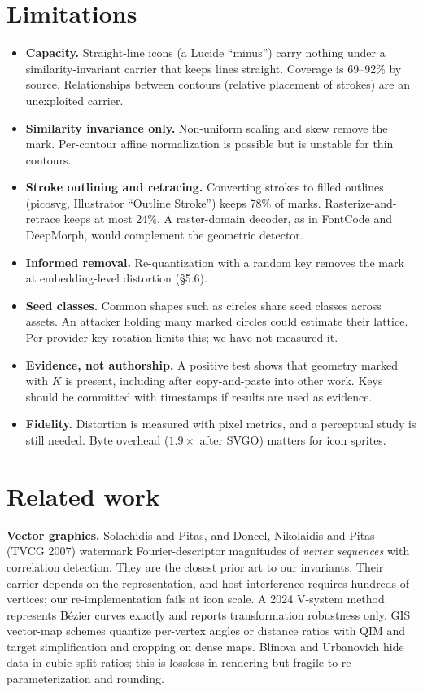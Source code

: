\documentclass[10pt,twocolumn]{article}
\begin{document}
\section{Limitations}
\begin{itemize}
\item \textbf{Capacity.} Straight-line icons (a Lucide ``minus'') carry nothing under a similarity-invariant carrier that keeps lines straight. Coverage is 69--92\% by source. Relationships between contours (relative placement of strokes) are an unexploited carrier.
\item \textbf{Similarity invariance only.} Non-uniform scaling and skew remove the mark. Per-contour affine normalization is possible but is unstable for thin contours.
\item \textbf{Stroke outlining and retracing.} Converting strokes to filled outlines (picosvg, Illustrator ``Outline Stroke'') keeps 78\% of marks. Rasterize-and-retrace keeps at most 24\%. A raster-domain decoder, as in FontCode and DeepMorph, would complement the geometric detector.
\item \textbf{Informed removal.} Re-quantization with a random key removes the mark at embedding-level distortion (\S5.6).
\item \textbf{Seed classes.} Common shapes such as circles share seed classes across assets. An attacker holding many marked circles could estimate their lattice. Per-provider key rotation limits this; we have not measured it.
\item \textbf{Evidence, not authorship.} A positive test shows that geometry marked with $K$ is present, including after copy-and-paste into other work. Keys should be committed with timestamps if results are used as evidence.
\item \textbf{Fidelity.} Distortion is measured with pixel metrics, and a perceptual study is still needed. Byte overhead ($1.9\times$ after SVGO) matters for icon sprites.
\end{itemize}

\section{Related work}
\textbf{Vector graphics.} Solachidis and Pitas, and Doncel, Nikolaidis and Pitas (TVCG 2007) watermark Fourier-descriptor magnitudes of \emph{vertex sequences} with correlation detection. They are the closest prior art to our invariants. Their carrier depends on the representation, and host interference requires hundreds of vertices; our re-implementation fails at icon scale. A 2024 V-system method represents Bézier curves exactly and reports transformation robustness only. GIS vector-map schemes quantize per-vertex angles or distance ratios with QIM and target simplification and cropping on dense maps. Blinova and Urbanovich hide data in cubic split ratios; this is lossless in rendering but fragile to re-parameterization and rounding.
\end{document}
